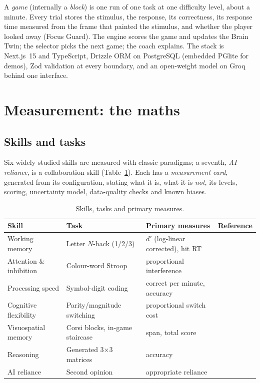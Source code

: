 \documentclass[11pt,a4paper]{article}
\begin{document}
A \emph{game} (internally a \emph{block}) is one run of one task at one difficulty level, about a minute. Every trial stores the stimulus, the response, its correctness, its response time measured from the frame that painted the stimulus, and whether the player looked away (Focus Guard). The engine scores the game and updates the Brain Twin; the selector picks the next game; the coach explains. The stack is Next.js~15 and TypeScript, Drizzle ORM on PostgreSQL (embedded PGlite for demos), Zod validation at every boundary, and an open-weight model on Groq behind one interface.

\section{Measurement: the maths}
\label{sec:measure}

\subsection{Skills and tasks}
Six widely studied skills are measured with classic paradigms; a seventh, \emph{AI reliance}, is a collaboration skill (Table~\ref{tab:tasks}). Each has a \emph{measurement card}, generated from its configuration, stating what it is, what it is \emph{not}, its levels, scoring, uncertainty model, data-quality checks and known biases.

\begin{table}[H]
\centering\small
\caption{Skills, tasks and primary measures.}
\label{tab:tasks}
\begin{tabularx}{\linewidth}{@{}l l X l@{}}
\toprule
Skill & Task & Primary measures & Reference\\
\midrule
Working memory & Letter $N$-back (1/2/3) & $d'$ (log-linear corrected), hit RT & \cite{kirchner,owen}\\
Attention \& inhibition & Colour-word Stroop & proportional interference & \cite{stroop,macleod}\\
Processing speed & Symbol-digit coding & correct per minute, accuracy & \cite{smith,salthouse}\\
Cognitive flexibility & Parity/magnitude switching & proportional switch cost & \cite{rogers}\\
Visuospatial memory & Corsi blocks, in-game staircase & span, total score & \cite{corsi,kessels}\\
Reasoning & Generated 3$\times$3 matrices & accuracy & \cite{raven,matzen}\\
AI reliance & Second opinion & appropriate reliance & \cite{schemmer}\\
\bottomrule
\end{tabularx}
\end{table}
\end{document}

